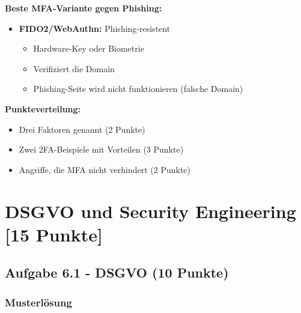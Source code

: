 \documentclass[12pt,a4paper]{article}
\begin{document}
\begin{tcolorbox}[colback=solutionbg, colframe=black!30]
\textbf{Beste MFA-Variante gegen Phishing:}

\begin{itemize}
    \item \textbf{FIDO2/WebAuthn:} Phishing-resistent
    \begin{itemize}
        \item Hardware-Key oder Biometrie
        \item Verifiziert die Domain
        \item Phishing-Seite wird nicht funktionieren (falsche Domain)
    \end{itemize}
\end{itemize}

\end{tcolorbox}

\textbf{Punkteverteilung:}
\begin{itemize}
    \item Drei Faktoren genannt (2 Punkte) \checkmark
    \item Zwei 2FA-Beispiele mit Vorteilen (3 Punkte) \checkmark
    \item Angriffe, die MFA nicht verhindert (2 Punkte) \checkmark
\end{itemize}


\newpage

\section{DSGVO und Security Engineering [15 Punkte]}

\subsection{Aufgabe 6.1 - DSGVO (10 Punkte)}

\subsubsection*{Musterlösung}
\end{document}
